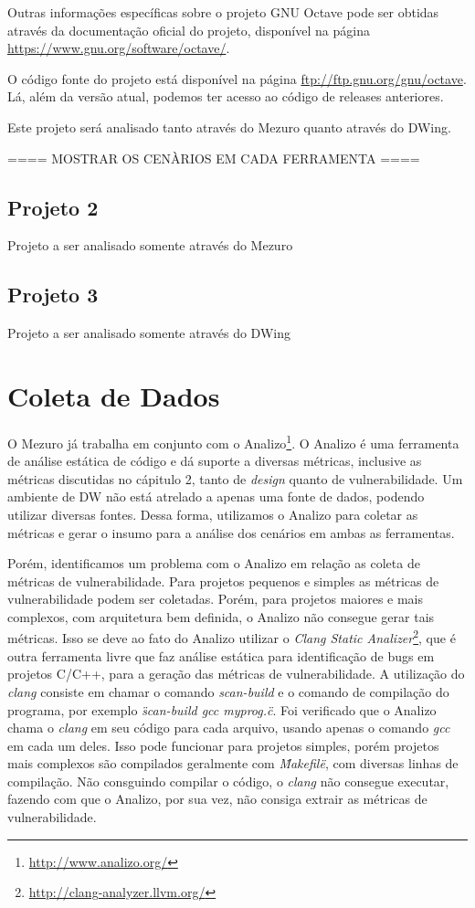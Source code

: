 Outras informações específicas sobre o projeto GNU Octave pode ser obtidas através da documentação oficial do projeto, disponível na página \url{https://www.gnu.org/software/octave/}.

O código fonte do projeto está disponível na página \url{ftp://ftp.gnu.org/gnu/octave}. Lá, além da versão atual, podemos ter acesso ao código de releases anteriores.

Este projeto será analisado tanto através do Mezuro quanto através do DWing.


==== MOSTRAR OS CENÀRIOS EM CADA FERRAMENTA ====


\subsection{Projeto 2}
\label{}

Projeto a ser analisado somente através do Mezuro

\subsection{Projeto 3}
\label{}

Projeto a ser analisado somente através do DWing


\section{Coleta de Dados}

O Mezuro já trabalha em conjunto com o Analizo\footnote{\url{http://www.analizo.org/}}. O Analizo é uma ferramenta de análise estática de código e dá suporte a diversas métricas, inclusive as métricas discutidas no cápitulo 2, tanto de \emph{design} quanto de vulnerabilidade. Um ambiente de DW não está atrelado a apenas uma fonte de dados, podendo utilizar diversas fontes. Dessa forma, utilizamos o Analizo para coletar as métricas e gerar o insumo para a análise dos cenários em ambas as ferramentas.

Porém, identificamos um problema com o Analizo em relação as coleta de métricas de vulnerabilidade. Para projetos pequenos e simples as métricas de vulnerabilidade podem ser coletadas. Porém, para projetos maiores e mais complexos, com arquitetura bem definida, o Analizo não consegue gerar tais métricas. Isso se deve ao fato do Analizo utilizar o \emph{Clang Static Analizer}\footnote{\url{http://clang-analyzer.llvm.org/}}, que é outra ferramenta livre que faz análise estática para identificação de bugs em projetos C/C++, para a geração das métricas de vulnerabilidade. A utilização do \emph{clang} consiste em chamar o comando \emph{scan-build}  e o comando de compilação do programa, por exemplo \emph{\"scan-build gcc myprog.c\"}. Foi verificado que o Analizo chama o \emph{clang} em seu código para cada arquivo, usando apenas o comando \emph{gcc} em cada um deles. Isso pode funcionar para projetos simples, porém projetos mais complexos são compilados geralmente com \emph{\"Makefile\"}, com diversas linhas de compilação. Não consguindo compilar o código, o \emph{clang} não consegue executar, fazendo com que o Analizo, por sua vez, não consiga extrair as métricas de vulnerabilidade. 

